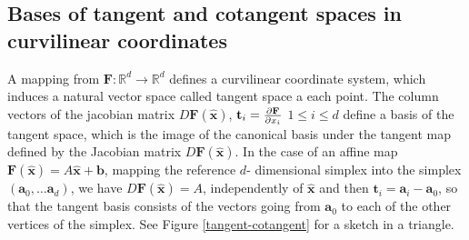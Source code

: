 \subsection{Bases of tangent and cotangent spaces in curvilinear coordinates}

A mapping from $ \mathbf{F}: \mathbb{R}^d \rightarrow \mathbb{R}^d$ defines a curvilinear coordinate system, which induces a natural vector space called tangent space a each point. The column vectors of the jacobian matrix 
$D \mathbf{F} ( \hat{ \mathbf{x}})$, $ \mathbf{t}_i=\frac{\partial  \mathbf{F}}{\partial  x_i}$ $ 1\leq i \leq d$ define a basis of the tangent space, which is the image of the canonical basis under the tangent map defined by the Jacobian matrix $D \mathbf{F} ( \hat{ \mathbf{x}})$. 
In the case of an affine map $ \mathbf{F} ( \hat{\mathbf{x}}) = A \hat{\mathbf{x}} + \mathbf{b}$, mapping the reference $d$- dimensional simplex into the simplex $( \mathbf{a}_0, \dots \mathbf{a}_d)$,
we have
$D \mathbf{F} ( \hat{ \mathbf{x}})=A$, independently of $ \hat{\mathbf{x}}$ and then
$ \mathbf{t}_i= \mathbf{a}_i -  \mathbf{a}_0$, so that the tangent basis consists of the vectors going from $ \mathbf{a}_0$ to each of the other vertices of the simplex. See Figure \ref{tangent-cotangent} for a sketch in a triangle. 


